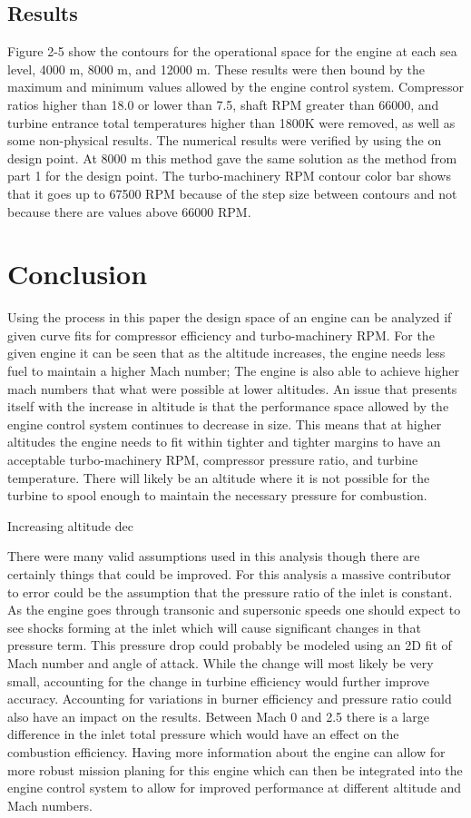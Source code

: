\documentclass[journal ]{new-aiaa}
\begin{document}
\subsection{Results}
Figure 2-5 show the contours for the operational space for the engine at each sea level, 4000 m, 8000 m, and 12000 m. 
These results were then bound by the maximum and minimum values allowed by the engine control system. Compressor ratios
higher than 18.0 or lower than 7.5, shaft RPM greater than 66000, and turbine entrance total
temperatures higher than 1800K were removed, as well as some non-physical results.
The numerical results were verified by using the on design point.
At 8000 m this method gave the same solution as the method from part 1 for the design point. The turbo-machinery RPM contour color bar shows that it goes up to 67500 RPM because of the step size between contours and not because there are values above 66000 RPM.


\section{Conclusion}

Using the process in this paper the design space of an engine can be analyzed if given curve fits for compressor efficiency and turbo-machinery RPM. 
For the given engine it can be seen that as the altitude increases, the engine needs less fuel to maintain a higher Mach number; The engine is also able to achieve higher mach numbers that what were possible at lower altitudes. 
An issue that presents itself with the increase in altitude is that the performance space allowed by the engine control system continues to decrease in size.
This means that at higher altitudes the engine needs to fit within tighter and tighter margins to have an acceptable turbo-machinery RPM, compressor pressure ratio, and turbine temperature.
There will likely be an altitude where it is not possible for the turbine to spool enough to maintain the necessary pressure for combustion.

Increasing altitude dec

There were many valid assumptions used in this analysis though there are certainly things that could be improved.
For this analysis a massive contributor to error could be the assumption that the pressure ratio of the inlet is constant. As the engine goes through transonic and supersonic speeds one should expect to see shocks forming at the inlet which will cause significant changes in that pressure term.
This pressure drop could probably be modeled using an 2D fit of Mach number and angle of attack. While the change will most likely be very small, accounting for the change in turbine efficiency would further improve accuracy. Accounting for variations in burner efficiency and pressure ratio could also have an impact on the results. Between Mach 0 and 2.5 there is a large difference in the inlet total pressure which would have an effect on the combustion efficiency.
Having more information about the engine can allow for more robust mission planing for this engine which can then be integrated into the engine control system to allow for improved performance at different altitude and Mach numbers. 
\end{document}
